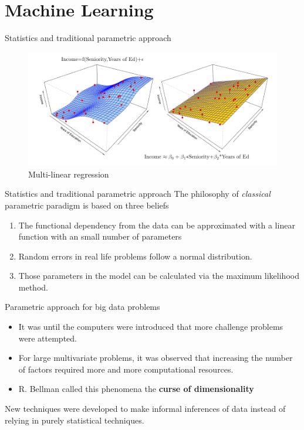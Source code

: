 \documentclass[11pt, aspectratio=43]{beamer}
\begin{document}
\section{Machine Learning}
\begin{frame}{Statistics and traditional parametric approach}
	\begin{figure}[h]
		\centering
		\includegraphics[scale=0.75]{Figures/fig_stat_reg.pdf}
		\caption{Multi-linear regression}
	\end{figure}
\end{frame}




\begin{frame}{Statistics and traditional parametric approach}
	The philosophy of \textit{classical} parametric paradigm is based on three beliefs
	\begin{enumerate}
		\item The functional dependency from the data can be approximated with a linear function with an small number of parameters
		\item Random errors in real life problems follow a normal distribution.
		\item Those parameters  in the model can be calculated via the maximum likelihood method.
	\end{enumerate}
\end{frame}

\begin{frame}{Parametric approach for big data problems}
	\begin{itemize}
		\item 	It was until the computers were introduced that more challenge problems were attempted.
		\item For large multivariate problems, it was observed that increasing the number of factors required more and more computational resources.
		\item R. Bellman called this phenomena the \textbf{curse of dimensionality} 
	\end{itemize}

	New techniques were developed to make informal inferences of data instead of relying in purely statistical techniques. 

\end{frame}
\end{document}
